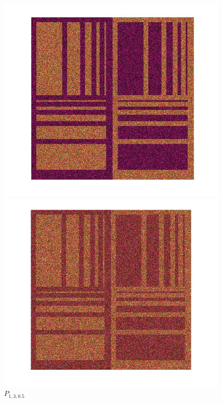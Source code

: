 \documentclass[12pt,a4paper]{article}
\begin{document}
\begin{figure}[!htb]
  \includegraphics[width=\linewidth]{Eq_Phantom_0p000_1_3_1.jpg}
	\caption{$P_{1,3,0.0}$}\label{fig:awesome_image1}
\endminipage\hfill
{}
  \includegraphics[width=\linewidth]{Eq_Phantom_0p500_1_3_1.jpg}
	\caption{$P_{1,3,0.5}$}\label{fig:awesome_image1}
\endminipage\hfill
{}%

\end{figure}
\end{document}
